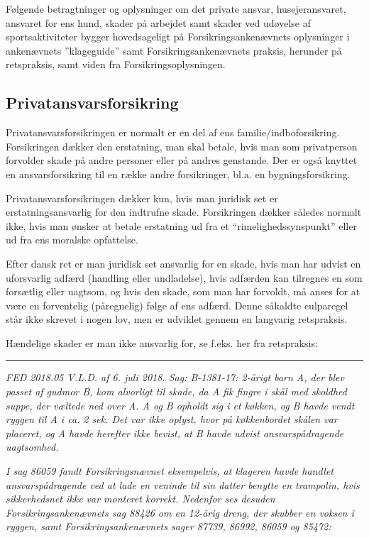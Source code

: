 \documentclass[]{book}
\begin{document}
Følgende betragtninger og oplysninger om det private ansvar, husejeransvaret, ansvaret for ens hund, skader på arbejdet samt skader ved udøvelse af sportsaktiviteter bygger hovedsageligt på Forsikringsankenævnets oplysninger i ankenævnets ''klageguide'' samt Forsikringsankenævnets praksis, herunder på retspraksis, samt viden fra Forsikringsoplysningen.

\hypertarget{privatansvarsforsikring}{%
\subsection{Privatansvarsforsikring}\label{privatansvarsforsikring}}

Privatansvarsforsikringen er normalt er en del af ens familie/indboforsikring. Forsikringen dækker den erstatning, man skal betale, hvis man som privatperson forvolder skade på andre personer eller på andres genstande. Der er også knyttet en ansvarsforsikring til en række andre forsikringer, bl.a. en bygningsforsikring.

Privatansvarsforsikringen dækker kun, hvis man juridisk set er erstatningsansvarlig for den indtrufne skade. Forsikringen dækker således normalt ikke, hvis man ønsker at betale erstatning ud fra et ``rimelighedssynspunkt'' eller ud fra ens moralske opfattelse.

Efter dansk ret er man juridisk set ansvarlig for en skade, hvis man har udvist en uforsvarlig adfærd (handling eller undladelse), hvis adfærden kan tilregnes en som forsætlig eller uagtsom, og hvis den skade, som man har forvoldt, må anses for at være en forventelig (påregnelig) følge af ens adfærd. Denne såkaldte culparegel står ikke skrevet i nogen lov, men er udviklet gennem en langvarig retspraksis.

Hændelige skader er man ikke ansvarlig for, se f.eks. her fra retspraksis:

\begin{center}\rule{0.5\linewidth}{\linethickness}\end{center}

\emph{FED 2018.05 V.L.D. af 6. juli 2018. Sag: B-1381-17: 2-årigt barn A, der blev passet af gudmor B, kom alvorligt til skade, da A fik fingre i skål med skoldhed suppe, der væltede ned over A. A og B opholdt sig i et køkken, og B havde vendt ryggen til A i ca. 2 sek. Det var ikke oplyst, hvor på køkkenbordet skålen var placeret, og A havde herefter ikke bevist, at B havde udvist ansvarspådragende uagtsomhed. }

\emph{I sag 86059 fandt Forsikringsnævnet eksempelvis, at klageren havde handlet ansvarspådragende ved at lade en veninde til sin datter benytte en trampolin, hvis sikkerhedsnet ikke var monteret korrekt. Nedenfor ses desuden Forsikringsankenævnets sag 88426 om en 12-årig dreng, der skubber en voksen i ryggen, samt Forsikringsankenævnets sager 87739, 86992, 86059 og 85472:}
\end{document}
